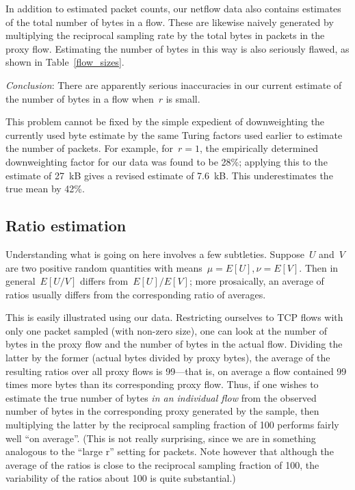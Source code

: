 \documentclass{paper}
\begin{document}
In addition to estimated packet counts, our netflow data also contains estimates
of the total number of bytes in a flow. These are likewise naively generated by
multiplying the reciprocal sampling rate by the total bytes in packets in the
proxy flow. Estimating the number of bytes in this way is also seriously flawed,
as shown in Table~\ref{flow_sizes}.

\emph{Conclusion}: There are apparently serious inaccuracies in our current
estimate of the number of bytes in a flow when~$r$ is small.

This problem cannot be fixed by the simple expedient of downweighting the
currently used byte estimate by the same Turing factors used earlier to estimate
the number of packets. For example, for~$r = 1$, the empirically determined
downweighting factor for our data was found to be 28\%; applying this to the
estimate of 27~kB gives a revised estimate of 7.6~kB. This underestimates the
true mean by 42\%.

\subsection{Ratio estimation}

Understanding what is going on here involves a few subtleties. Suppose~$U$
and~$V$ are two positive random quantities with means~$\mu = E[U], \nu = E[V]$.
Then in general~$E[U/V]$ differs from~$E[U]/E[V]$; more prosaically, an average
of ratios usually differs from the corresponding ratio of averages.

This is easily illustrated using our data. Restricting ourselves to TCP flows
with only one packet sampled (with non-zero size), one can look at the number
of bytes in the proxy flow and the number of bytes in the actual flow. Dividing
the latter by the former (actual bytes divided by proxy bytes), the average of
the resulting ratios over all proxy flows is 99---that is, on average a flow
contained 99 times more bytes than its corresponding proxy flow. Thus, if one
wishes to estimate the true number of bytes \emph{in an individual flow} from
the observed number of bytes in the corresponding proxy generated by the
sample, then multiplying the latter by the reciprocal sampling fraction of 100
performs fairly well ``on average''. (This is not really surprising, since we
are in something analogous to the ``large r'' setting for packets. Note however
that although the average of the ratios is close to the reciprocal sampling
fraction of 100, the variability of the ratios about 100 is quite substantial.)
\end{document}
